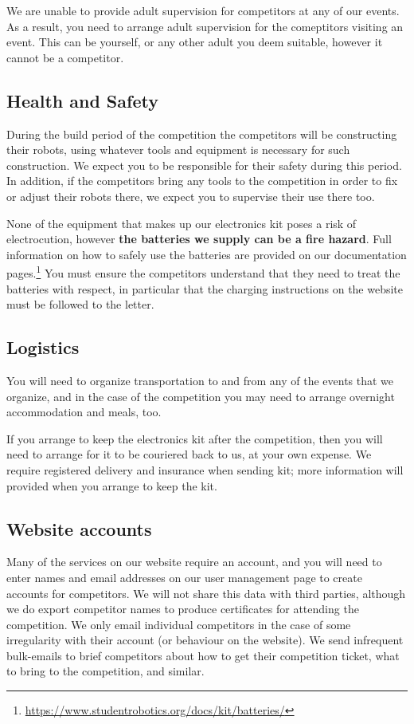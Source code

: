 \documentclass[a4paper]{article}
\begin{document}
We are unable to provide adult supervision for competitors at any of our
events. As a result, you need to arrange adult supervision for the comeptitors
visiting an event. This can be yourself, or any other adult you deem suitable,
however it cannot be a competitor.

\subsection*{Health and Safety}

During the build period of the competition the competitors will be constructing
their robots, using whatever tools and equipment is necessary for such
construction. We expect you to be responsible for their safety during this
period. In addition, if the competitors bring any tools to the competition in
order to fix or adjust their robots there, we expect you to supervise their use
there too.

None of the equipment that makes up our electronics kit poses a risk of
electrocution, however \textbf{the batteries we supply can be a fire hazard}.
Full information on how to safely use the batteries are provided on our
documentation
pages.\footnote{\url{https://www.studentrobotics.org/docs/kit/batteries/}}
You must ensure the competitors understand that they need to treat the
batteries with respect, in particular that the charging instructions on
the website must be followed to the letter.

\subsection*{Logistics}

You will need to organize transportation to and from any of the events that we
organize, and in the case of the competition you may need to arrange overnight
accommodation and meals, too.

If you arrange to keep the electronics kit after the competition, then you will
need to arrange for it to be couriered back to us, at your own expense. We
require registered delivery and insurance when sending kit; more information
will provided when you arrange to keep the kit.

\subsection*{Website accounts}

Many of the services on our website require an account, and you will need to
enter names and email addresses on our user management page to create accounts
for competitors. We will not share this data with third parties, although we do
export competitor names to produce certificates for attending the competition.
We only email individual competitors in the case of some irregularity with
their account (or behaviour on the website). We send infrequent bulk-emails
to brief competitors about how to get their competition ticket, what to bring
to the competition, and similar.
\end{document}
